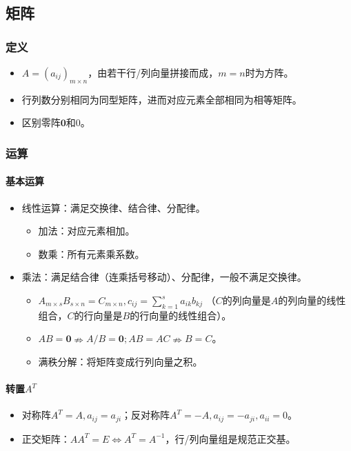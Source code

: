\documentclass[
12pt, %
a4paper, 
oneside, %
headinclude,footinclude, %
]{scrartcl}
\begin{document}
\subsection{矩阵}
\subsubsection{定义}
\begin{itemize}
\item $ A = (a_{ij})_{m \times n} $，由若干行/列向量拼接而成，$ m = n $时为方阵。
\item 行列数分别相同为同型矩阵，进而对应元素全部相同为相等矩阵。
\item 区别零阵$ \mathbf{0} $和$ 0 $。
\end{itemize}
\subsubsection{运算}
\paragraph{基本运算}
\begin{itemize}
\item 线性运算：满足交换律、结合律、分配律。
\begin{itemize}
\item 加法：对应元素相加。
\item 数乘：所有元素乘系数。
\end{itemize}
\item 乘法：满足结合律（连乘括号移动）、分配律，一般不满足交换律。
\begin{itemize}
\item $ A_{m \times s}B_{s \times n} = C_{m \times n}, c_{ij} = \sum_{k = 1}^s a_{ik}b_{kj} $
（$ C $的列向量是$ A $的列向量的线性组合，$ C $的行向量是$ B $的行向量的线性组合）。
\item $ AB = \mathbf{0} \nRightarrow A/B = \mathbf{0}; AB = AC \nRightarrow B = C $。
\item 满秩分解：将矩阵变成行列向量之积。
\end{itemize}
\end{itemize}
\paragraph{转置$ A^T $}
\begin{itemize}
\item 对称阵$ A^T = A, a_{ij} = a_{ji} $；反对称阵$ A^T = -A, a_{ij} = -a_{ji}, a_{ii} = 0 $。
\item 正交矩阵：$ AA^T = E \Leftrightarrow A^T = A^{-1} $，行/列向量组是规范正交基。
\end{itemize}
\end{document}

